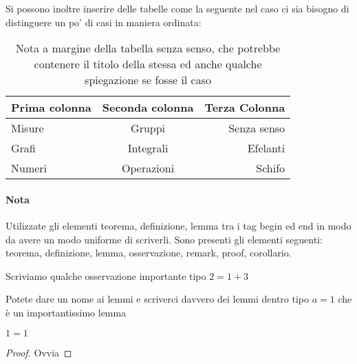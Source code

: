 Si possono inoltre inserire delle tabelle come la seguente nel caso ci sia
bisogno di distinguere un po' di casi in maniera ordinata:

\begin{table}[h]
  \caption{Nota a margine della tabella senza senso, che potrebbe contenere
  il titolo della stessa ed anche qualche spiegazione se fosse il caso}
  \begin{center}
    \footnotesize %
    \begin{tabular}{lcr}
      \toprule %
      Prima colonna & Seconda colonna & Terza Colonna \\
      \midrule %
      Misure & Gruppi & Senza senso \\
      Grafi & Integrali & Efelanti \\
      Numeri & Operazioni & Schifo \\
      \bottomrule %
    \end{tabular}
  \end{center}
\end{table}

\paragraph{Nota} Utilizzate gli elementi teorema, definizione, lemma tra i
tag begin ed end in modo da avere un modo uniforme di scriverli. Sono presenti
gli elementi seguenti: teorema, definizione, lemma, osservazione, remark,
proof, corollario.

\begin{osservazione}
  Scriviamo qualche osservazione importante tipo $2 = 1 + 3$
\end{osservazione}

\begin{lemma}
  Potete dare un nome ai lemmi e scriverci davvero dei lemmi dentro tipo
  $a = 1$ che è un importantissimo lemma
\end{lemma}

\begin{teorema}
  $1 = 1$
\end{teorema}
\begin{proof}
  Ovvia
\end{proof}

